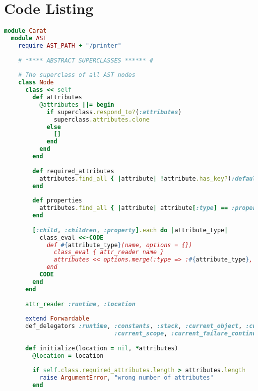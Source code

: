 

\section{Code Listing}
\begin{lstlisting}[title={\small\Helvetica ast/ast.rb},language=Ruby]
module Carat
  module AST
    require AST_PATH + "/printer"
    
    # ***** ABSTRACT SUPERCLASSES ****** #
    
    # The superclass of all AST nodes
    class Node
      class << self
        def attributes
          @attributes ||= begin
            if superclass.respond_to?(:attributes)
              superclass.attributes.clone
            else
              []
            end
          end
        end
        
        def required_attributes
          attributes.find_all { |attribute| !attribute.has_key?(:default) }
        end
        
        def properties
          attributes.find_all { |attribute| attribute[:type] == :property }
        end
        
        [:child, :children, :property].each do |attribute_type|
          class_eval <<-CODE
            def #{attribute_type}(name, options = {})
              class_eval { attr_reader name }
              attributes << options.merge(:type => :#{attribute_type}, :name => name)
            end
          CODE
        end
      end
      
      attr_reader :runtime, :location
      
      extend Forwardable
      def_delegators :runtime, :constants, :stack, :current_object, :current_location,
                               :current_scope, :current_failure_continuation
      
      def initialize(location = nil, *attributes)
        @location = location
        
        if self.class.required_attributes.length > attributes.length
          raise ArgumentError, "wrong number of attributes"
        end
        

\end{lstlisting}
